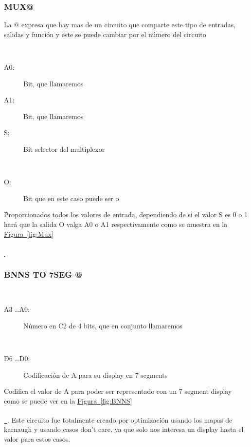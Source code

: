 \documentclass{article}
\newcommand*{\figref}[2][]{
  \hyperref[{fig:#2}]{
    Figura~\ref*{fig:#2}
    \ifx\\#1\\%
    \else
      \,#1
    \fi
  }
}
\begin{document}
\newpage
\subsubsection{MUX@}
\label{sec:MUX@}
\noindent La @ expresa que hay mas de un circuito que comparte este tipo de entradas, salidas y función y este se puede cambiar por el número del circuito
\begin{description}
    \item[Entradas: ] 
    \begin{description}
        \item[A0:] Bit, que llamaremos 
        \item[A1:] Bit, que llamaremos 
        \item[S:] Bit selector del multiplexor
    \end{description}
    
    \item[Salidas: ] 
    \begin{description}
    \item[O:] Bit que en este caso puede ser  o 
    \end{description}
    
    \item[Función: ]Proporcionados todos los valores de entrada, dependiendo de si el valor S es 0 o 1 hará que la salida O valga A0 o A1 respectivamente como se muestra en la\figref{Mux}
    
\end{description}


\subsubsection{BNNS TO 7SEG @}
\label{sec:BNSS7SEG}
\begin{description}
    \item[Entradas: ] 
    \begin{description}
        \item[A3 \dots A0:] Número en C2 de 4 bits, que en conjunto llamaremos 
    \end{description}
    
    \item[Salidas: ] 
    \begin{description}
        \item[D6 \dots D0:] Codificación de A para su display en 7 segments 
    \end{description}
    
    \item[Función: ] Codifica el valor de A para poder ser representado con un 7 segment display como se puede ver en la \figref{BNNS}. Este circuito fue totalmente creado por optimización usando los mapas de karnaugh y usando casos don't care, ya que solo nos interesa un display hasta el valor  para estos casos.
    
\end{description}
\end{document}
